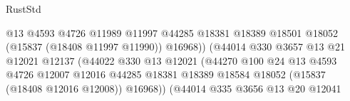 \begin{lexlean}{RustStd}
\begin{coremodule}
{\begin{coremodule}
{{{{{{{{{{{{{{{{{{{{{{{{{{{{{{{{{{{{{{{{{{{{{{{{{{{{{{{{{{{{                                                    @13
                                                    @4593
                                                    @4726
                                                    @11989
                                                    @11997
                                                    @44285
                                                    @18381
                                                    @18389
                                                    @18501
                                                    @18052
                                                    (@15837 (@18408 @11997 @11990))
                                                    @16968))
                                                (@44014
                                                  @330
                                                  @3657
                                                  @13
                                                  @21
                                                  @12021
                                                  @12137
                                                  (@44022
                                                    @330
                                                    @13
                                                    @12021
                                                    (@44270
                                                      @100
                                                      @24
                                                      @13
                                                      @4593
                                                      @4726
                                                      @12007
                                                      @12016
                                                      @44285
                                                      @18381
                                                      @18389
                                                      @18584
                                                      @18052
                                                      (@15837 (@18408 @12016 @12008))
                                                      @16968))
                                                  (@44014
                                                    @335
                                                    @3656
                                                    @13
                                                    @20
                                                    @12041
}}}}}}}}}}}}}}}}}}}}}}}}}}}}}}}}}}}}}}}}}}}}}}}}}}}}}}}}}}}}
\end{coremodule}}
\end{coremodule}
\end{lexlean}
